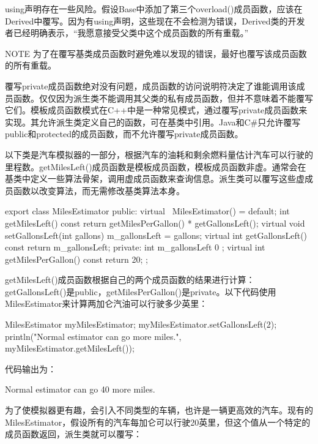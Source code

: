 using声明存在一些风险。假设Base中添加了第三个overload()成员函数，应该在Derived中覆写。因为有using声明，这些现在不会检测为错误，Derived类的开发者已经明确表示，“我愿意接受父类中这个成员函数的所有重载。”

\begin{myNotic}{NOTE}
为了在覆写基类成员函数时避免难以发现的错误，最好也覆写该成员函数的所有重载。
\end{myNotic}


覆写private成员函数绝对没有问题，成员函数的访问说明符决定了谁能调用该成员函数。仅仅因为派生类不能调用其父类的私有成员函数，但并不意味着不能覆写它们。模板成员函数模式在C++中是一种常见模式，通过覆写private成员函数来实现。其允许派生类定义自己的函数，可在基类中引用。Java和C\#只允许覆写public和protected的成员函数，而不允许覆写private成员函数。

以下类是汽车模拟器的一部分，根据汽车的油耗和剩余燃料量估计汽车可以行驶的里程数。getMilesLeft()成员函数是模板成员函数，模板成员函数非虚。通常会在基类中定义一些算法骨架，调用虚成员函数来查询信息。派生类可以覆写这些虚成员函数以改变算法，而无需修改基类算法本身。

\begin{cpp}
export class MilesEstimator
{
    public:
        virtual ~MilesEstimator() = default;
        int getMilesLeft() const { return getMilesPerGallon() * getGallonsLeft(); }
        virtual void setGallonsLeft(int gallons) { m_gallonsLeft = gallons; }
        virtual int getGallonsLeft() const { return m_gallonsLeft; }
    private:
        int m_gallonsLeft { 0 };
        virtual int getMilesPerGallon() const { return 20; }
};
\end{cpp}

getMilesLeft()成员函数根据自己的两个成员函数的结果进行计算：getGallonsLeft()是public，getMilesPerGallon()是private。以下代码使用MilesEstimator来计算两加仑汽油可以行驶多少英里：

\begin{cpp}
MilesEstimator myMilesEstimator;
myMilesEstimator.setGallonsLeft(2);
println("Normal estimator can go {} more miles.",
    myMilesEstimator.getMilesLeft());
\end{cpp}

代码输出为：

\begin{shell}
Normal estimator can go 40 more miles.
\end{shell}

为了使模拟器更有趣，会引入不同类型的车辆，也许是一辆更高效的汽车。现有的MilesEstimator，假设所有的汽车每加仑可以行驶20英里，但这个值从一个特定的成员函数返回，派生类就可以覆写：

